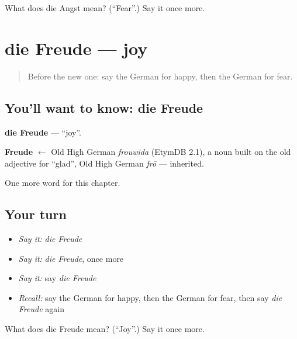 \begin{tcolorbox}[breakable,colback=teal!4,colframe=teal!35!black,title={Before you move on}]
What does die Angst mean? (\textquotedblleft{}Fear\textquotedblright{}.) Say it once more.
\end{tcolorbox}
\section[die Freude]{die Freude — joy}

\label{lesson:GE-C61-freude}



\begin{quote}
Before the new one: say the German for happy, then the German for fear.
\end{quote}

\subsection*{You'll want to know: die Freude}
\textbf{die Freude} — \textquotedblleft{}joy\textquotedblright{}.

\begin{cousinweb}
\textbf{Freude} $\leftarrow$ Old High German \emph{frouwida} (EtymDB 2.1), a noun built on the old adjective for \textquotedblleft{}glad\textquotedblright{}, Old High German \emph{frō} — inherited.
\end{cousinweb}

\begin{grammarlens}[title={What you've built}]
One more word for this chapter.
\end{grammarlens}

\subsection*{Your turn}
\begin{itemize}
\raggedright
  \item \emph{Say it:} \emph{die Freude}
  \item \emph{Say it:} \emph{die Freude}, once more
  \item \emph{Say it:} say \emph{die Freude}
  \item \emph{Recall:} say the German for happy, then the German for fear, then say \emph{die Freude} again
\end{itemize}

\begin{tcolorbox}[breakable,colback=teal!4,colframe=teal!35!black,title={Before you move on}]
What does die Freude mean? (\textquotedblleft{}Joy\textquotedblright{}.) Say it once more.
\end{tcolorbox}
